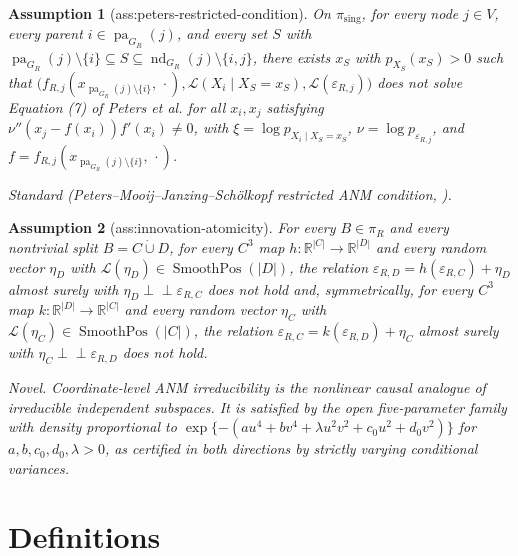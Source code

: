 \documentclass{article}
\newtheorem{assumption}{Assumption}
\begin{document}
\begin{assumption}[ass:peters-restricted-condition]\label{ass:peters-restricted-condition}
On \(\pi_{\mathrm{sing}}\), for every node \(j\in V\), every parent \(i\in\operatorname{pa}_{G_R}(j)\), and every set \(S\) with \(\operatorname{pa}_{G_R}(j)\setminus\{i\}\subseteq S\subseteq\operatorname{nd}_{G_R}(j)\setminus\{i,j\}\), there exists \(x_S\) with \(p_{X_S}(x_S)>0\) such that \(\bigl(f_{R,j}(x_{\operatorname{pa}_{G_R}(j)\setminus\{i\}},\,\cdot),\mathcal L(X_i\mid X_S=x_S),\mathcal L(\varepsilon_{R,j})\bigr)\) does not solve Equation (7) of Peters et al. for all \(x_i,x_j\) satisfying \(\nu''(x_j-f(x_i))f'(x_i)\neq0\), with \(\xi=\log p_{X_i\mid X_S=x_S}\), \(\nu=\log p_{\varepsilon_{R,j}}\), and \(f=f_{R,j}(x_{\operatorname{pa}_{G_R}(j)\setminus\{i\}},\,\cdot)\).
\par\smallskip\noindent\emph{Standard} (Peters--Mooij--Janzing--Schölkopf restricted ANM condition, \cite{PetersEtAl2014}).
\end{assumption}

\begin{assumption}[ass:innovation-atomicity]\label{ass:innovation-atomicity}
For every \(B\in\pi_R\) and every nontrivial split \(B=C\mathbin{\dot\cup}D\), for every \(C^3\) map \(h:\mathbb R^{|C|}\to\mathbb R^{|D|}\) and every random vector \(\eta_D\) with \(\mathcal L(\eta_D)\in\operatorname{SmoothPos}(|D|)\), the relation \(\varepsilon_{R,D}=h(\varepsilon_{R,C})+\eta_D\) almost surely with \(\eta_D\perp\!\!\!\perp\varepsilon_{R,C}\) does not hold and, symmetrically, for every \(C^3\) map \(k:\mathbb R^{|D|}\to\mathbb R^{|C|}\) and every random vector \(\eta_C\) with \(\mathcal L(\eta_C)\in\operatorname{SmoothPos}(|C|)\), the relation \(\varepsilon_{R,C}=k(\varepsilon_{R,D})+\eta_C\) almost surely with \(\eta_C\perp\!\!\!\perp\varepsilon_{R,D}\) does not hold.
\par\smallskip\noindent\emph{Novel.} Coordinate-level ANM irreducibility is the nonlinear causal analogue of irreducible independent subspaces. It is satisfied by the open five-parameter family with density proportional to \(\exp\{-(a u^4+b v^4+\lambda u^2v^2+c_0u^2+d_0v^2)\}\) for \(a,b,c_0,d_0,\lambda>0\), as certified in both directions by strictly varying conditional variances.
\end{assumption}

\section{Definitions}
\end{document}
